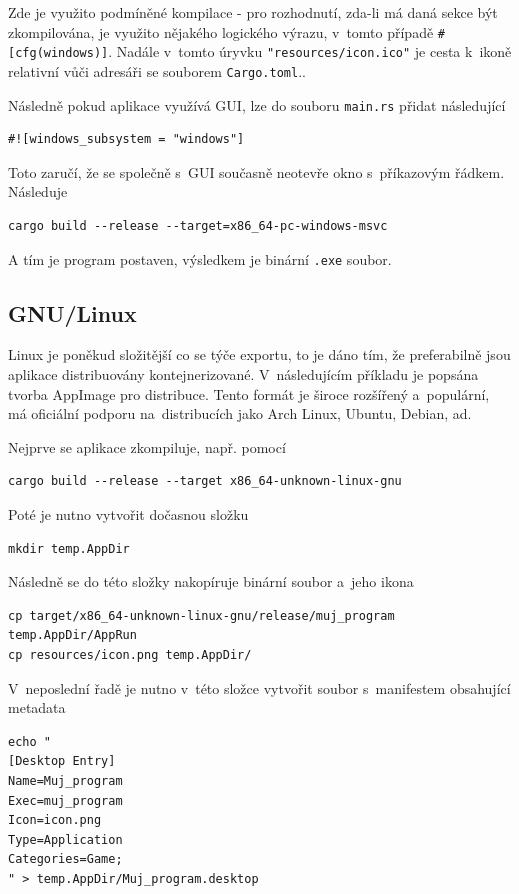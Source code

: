 \documentclass[a4paper, 12pt, twoside]{article} %
\newcommand{\rust}[1]{\texttt{#1}}
\begin{document}
		Zde je využito podmíněné kompilace - pro rozhodnutí, zda-li má daná sekce být zkompilována, je využito nějakého logického výrazu, v~tomto případě \texttt{#[cfg(windows)]}. Nadále v~tomto úryvku \rust{"resources/icon.ico"} je cesta k~ikoně relativní vůči adresáři se souborem \texttt{Cargo.toml}.\cite{comp_win_ico}.
		
		Následně pokud aplikace využívá GUI, lze do souboru \texttt{main.rs} přidat následující
		\begin{verbatim}
#![windows_subsystem = "windows"]
		\end{verbatim}
		
		Toto zaručí, že se společně s~GUI současně neotevře okno s~příkazovým řádkem. Následuje
		\begin{verbatim}
cargo build --release --target=x86_64-pc-windows-msvc
		\end{verbatim}
		
		A tím je program postaven, výsledkem je binární \texttt{.exe} soubor.\cite{winexport}


	\subsection{GNU/Linux}
		Linux je poněkud složitější co se týče exportu, to je dáno tím, že preferabilně jsou aplikace distribuovány kontejnerizované. V~následujícím příkladu je popsána tvorba AppImage pro distribuce. Tento formát je široce rozšířený a~populární, má oficiální podporu na~distribucích jako Arch Linux, Ubuntu, Debian, ad.\cite{appimage}

		Nejprve se aplikace zkompiluje, např. pomocí
		\begin{verbatim}
cargo build --release --target x86_64-unknown-linux-gnu
		\end{verbatim}

		Poté je nutno vytvořit dočasnou složku
		\begin{verbatim}
mkdir temp.AppDir
		\end{verbatim}
		
		Následně se do této složky nakopíruje binární soubor a~jeho ikona
		\begin{verbatim}
cp target/x86_64-unknown-linux-gnu/release/muj_program temp.AppDir/AppRun
cp resources/icon.png temp.AppDir/
		\end{verbatim}
		
		V~neposlední řadě je nutno v~této složce vytvořit soubor s~manifestem obsahující metadata
		\begin{verbatim}
echo "
[Desktop Entry]
Name=Muj_program
Exec=muj_program
Icon=icon.png
Type=Application
Categories=Game;
" > temp.AppDir/Muj_program.desktop
		\end{verbatim}
\end{document}

